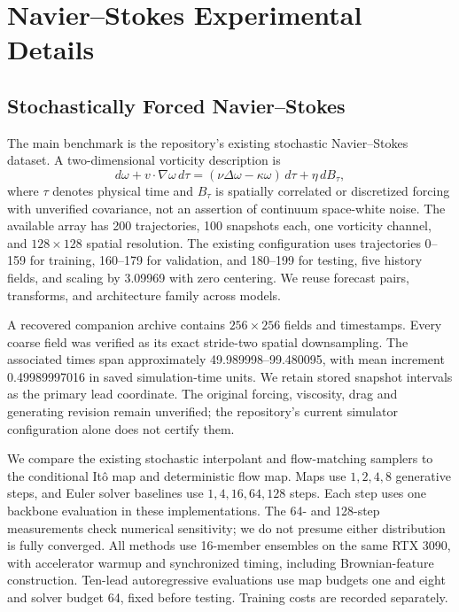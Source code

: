 \section{Navier--Stokes Experimental Details}\label{app:ns-details}
\subsection{Stochastically Forced Navier--Stokes}
The main benchmark is the repository's existing stochastic Navier--Stokes dataset. A two-dimensional vorticity description is
\begin{equation}
 d\omega+v\cdot\nabla\omega\,d\tau
 =(\nu\Delta\omega-\kappa\omega)\,d\tau
 +\eta\,dB_\tau,
\end{equation}
where $\tau$ denotes physical time and $B_\tau$ is spatially correlated or discretized forcing with unverified covariance, not an assertion of continuum space-white noise. The available array has 200 trajectories, 100 snapshots each, one vorticity channel, and $128\times128$ spatial resolution. The existing configuration uses trajectories 0--159 for training, 160--179 for validation, and 180--199 for testing, five history fields, and scaling by 3.09969 with zero centering. We reuse forecast pairs, transforms, and architecture family across models.

A recovered companion archive contains $256\times256$ fields and timestamps. Every coarse field was verified as its exact stride-two spatial downsampling. The associated times span approximately 49.989998--99.480095, with mean increment 0.49989997016 in saved simulation-time units. We retain stored snapshot intervals as the primary lead coordinate. The original forcing, viscosity, drag and generating revision remain unverified; the repository's current simulator configuration alone does not certify them.

We compare the existing stochastic interpolant and flow-matching samplers to the conditional It\^o map and deterministic flow map. Maps use $1,2,4,8$ generative steps, and Euler solver baselines use $1,4,16,64,128$ steps. Each step uses one backbone evaluation in these implementations. The 64- and 128-step measurements check numerical sensitivity; we do not presume either distribution is fully converged. All methods use 16-member ensembles on the same RTX 3090, with accelerator warmup and synchronized timing, including Brownian-feature construction. Ten-lead autoregressive evaluations use map budgets one and eight and solver budget 64, fixed before testing. Training costs are recorded separately.

